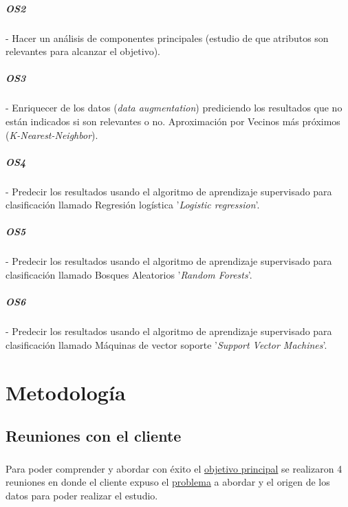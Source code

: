 \documentclass[10pt,a4paper,oneside]{book}
\begin{document}
\label{os:OS2}
\paragraph{OS2} - Hacer un análisis de componentes principales (estudio de que atributos son relevantes para alcanzar el objetivo).

\label{os:OS3}
\paragraph{OS3} - Enriquecer de los datos (\textit{data augmentation}) prediciendo los resultados que no están indicados si son relevantes o no. Aproximación por Vecinos más próximos (\textit{K-Nearest-Neighbor}).

\label{os:OS4}
\paragraph{OS4} - Predecir los resultados usando el algoritmo de aprendizaje supervisado para clasificación llamado Regresión logística '\textit{Logistic regression}'.

\label{os:OS5}
\paragraph{OS5} - Predecir los resultados usando el algoritmo de aprendizaje supervisado para clasificación llamado Bosques Aleatorios '\textit{Random Forests}'.

\label{os:OS6}
\paragraph{OS6} - Predecir los resultados usando el algoritmo de aprendizaje supervisado para clasificación llamado Máquinas de vector soporte '\textit{Support Vector Machines}'.

\chapter{Metodología}

\section{Reuniones con el cliente}

\paragraph{}
Para poder comprender y abordar con éxito el \hyperref[op:OP1]{objetivo principal} se realizaron 4 reuniones en donde el cliente expuso el \hyperref[op:OP1]{problema} a abordar y el origen de los datos para poder realizar el estudio.
\end{document}
